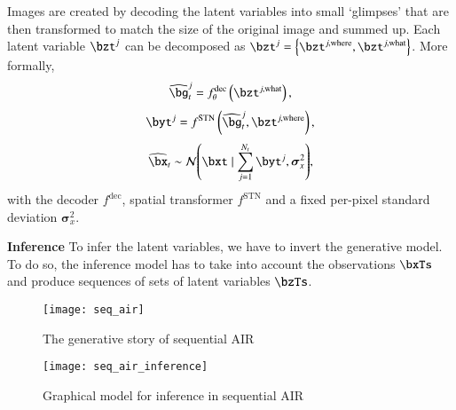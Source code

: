 Images are created by decoding the latent variables into small `glimpses' that are then transformed to match the size of the original image and summed up. Each latent variable $\bzt^j$ can be decomposed as $\bzt^j = \left\{ \bzt^{j, \mathrm{where}}, \bzt^{j, \mathrm{what}} \right\}$. More formally,
\begin{equation}
    \widehat{\bg}_t^j = f^{\mathrm{dec}}_\theta \left( \bzt^{j, \mathrm{what}} \right),
\end{equation}
\begin{equation}
    \byt^j = f^{\mathrm{STN}} \left( \widehat{\bg}_t^j, \bzt^{j, \mathrm{where}} \right),
\end{equation}
\begin{equation}
    \widehat{\bx}_t \sim \gauss{ \bxt \mid \sum_{j=1}^{N_t} \byt^j, \bm{\sigma}_x^2},
\end{equation}
with the decoder $f^{\mathrm{dec}}$, spatial transformer $f^{\mathrm{STN}}$ and a fixed per-pixel standard deviation $\bm{\sigma}_x^2$.

\textbf{Inference} To infer the latent variables, we have to invert the generative model. To do so, the inference model has to take into account the observations $\bxTs$ and produce sequences of sets of latent variables $\bzTs$.



\begin{figure}
    \texttt{[image: seq\_air]}
    \caption{The generative story of sequential AIR}
    \label{fig:seq_air}
\end{figure}

\begin{figure}
    \texttt{[image: seq\_air\_inference]}
    \caption{Graphical model for inference in sequential AIR}
    \label{fig:seq_air_inf}
\end{figure}